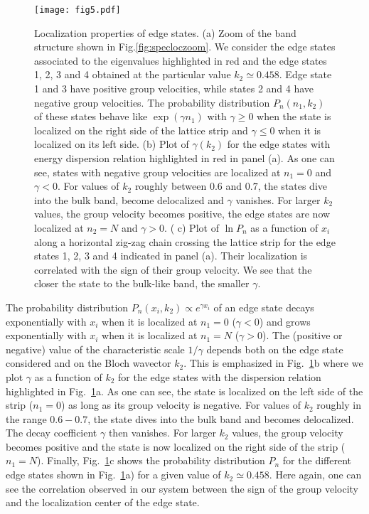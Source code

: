 \documentclass[aps,pra,showpacs,twocolumn,superscriptaddress]{revtex4-1}
\begin{document}
	
\begin{figure}[t!p]

	\centerline{\texttt{[image: fig5.pdf]}}
	\caption{\label{fig:edgelock} Localization properties of edge states. 
	(a) Zoom of the band structure shown in Fig.\ref{fig:specloczoom}. 
We consider the edge states associated to the eigenvalues highlighted in red and 
the edge states 1, 2, 3 and 4 obtained at the particular value $k_2\simeq0.458$. 
Edge state 1 and 3 have positive group velocities, while states 2 and 4 have negative group velocities. 
The probability distribution $P_n(n_1, k_2)$ of these states behave 
like $\exp(\gamma n_1)$ with $\gamma \geq 0$ when the state is localized 
on the right side of the lattice strip and $\gamma \leq 0$ when it is localized on its left side. 
(b) Plot of $\gamma(k_2)$ for the edge states with energy dispersion relation highlighted in 
red in panel (a). As one can see, states with negative group velocities are localized 
at $n_1=0$ and $\gamma < 0$. For values of $k_2$ roughly between $0.6$ and $0.7$, the states 
dive into the bulk band, become delocalized and $\gamma$ vanishes. 
For larger $k_2$ values, the group velocity becomes positive, the edge states are now
localized at $n_2=N$ and $\gamma >0$. (
c) Plot of $\ln P_n$ as a function of $x_i$ along a horizontal zig-zag chain crossing 
the lattice strip for the edge states 1, 2, 3 and 4 indicated in panel (a). 
Their localization is correlated with the sign of their group velocity. 
We see that the closer the state to the bulk-like band, the smaller $\gamma$. 
}
\end{figure}


The probability distribution $P_n(x_i, k_2) \propto e^{\gamma x_i}$ of an edge state decays exponentially 
with $x_i$ when it is localized at $n_1=0$ ($\gamma <0$) and grows exponentially with $x_i$ 
when it is localized at $n_1=N$ ($\gamma >0$). The (positive or negative) 
value of the characteristic scale $1/\gamma$ 
depends both on the edge state considered and on the Bloch wavector $k_2$. 
This is emphasized in Fig.~\ref{fig:edgelock}b where we plot $\gamma$ as a function of $k_2$ for 
the edge states with the dispersion relation highlighted in Fig.~\ref{fig:edgelock}a. As one can see,  the state is
localized on the left side of the strip ($n_1=0$) as long as its group velocity is negative. 
For values of $k_2$ roughly in the range $0.6 - 0.7$, the state dives into the
bulk band and becomes delocalized. The decay coefficient $\gamma$ then vanishes. For larger $k_2$ values,
the group velocity becomes positive and the state is now localized on the right 
side of the strip ($n_1=N$). Finally,  Fig.~\ref{fig:edgelock}c shows 
the probability distribution $P_n$ for the different edge states shown in 
Fig.~\ref{fig:edgelock}a) for a given value of $k_2\simeq0.458$. Here again, one can see the 
correlation observed in our system between the sign of the group velocity and the localization center of the edge state. 
\end{document}
